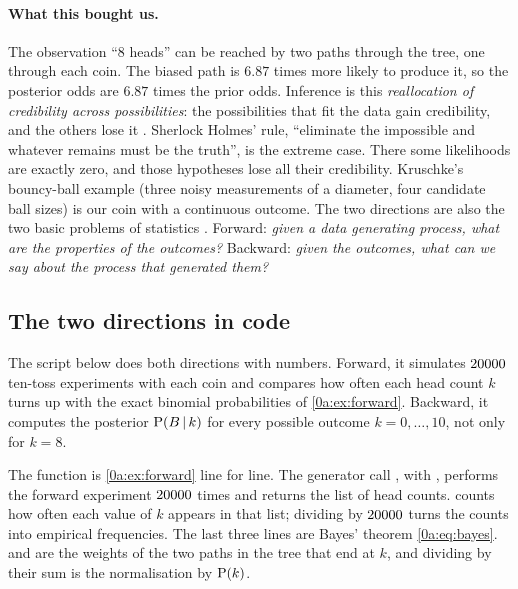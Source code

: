 \paragraph{What this bought us.}
The observation ``8 heads'' can be reached by two paths through the tree, one
through each coin. The biased path is $6.87$ times more likely to produce it,
so the posterior odds are $6.87$ times the prior odds. Inference is this
\emph{reallocation of credibility across possibilities}: the possibilities
that fit the data gain credibility, and the others lose it
. Sherlock Holmes' rule, ``eliminate the
impossible and whatever remains must be the truth'', is the extreme case.
There some likelihoods are exactly zero, and those hypotheses lose all their
credibility. Kruschke's bouncy-ball example (three noisy measurements of a
diameter, four candidate ball sizes) is our coin with a continuous outcome.
The two directions are also the two basic problems of statistics
. Forward: \emph{given a data generating process, what are the
properties of the outcomes?} Backward: \emph{given the outcomes, what can we
say about the process that generated them?}

\subsection*{The two directions in code}

The script below does both directions with numbers. Forward, it simulates
$20000$ ten-toss experiments with each coin and compares how often each
head count $k$ turns up with the exact binomial probabilities of
\cref{0a:ex:forward}. Backward, it computes the posterior $\operatorname{P}(B\,\vert\, k)$
for every possible outcome $k=0,\dots,10$, not only for $k=8$.


The function  is \cref{0a:ex:forward} line for line.
The generator call , with , performs
the forward experiment $20000$ times and returns the list of head counts.
 counts how often each value of $k$ appears in that list;
dividing by $20000$ turns the counts into empirical frequencies. The last
three lines are Bayes' theorem \eqref{0a:eq:bayes}.  and
 are the weights of the two paths in the tree that end at
$k$, and dividing by their sum is the normalisation by $\operatorname{P}(k)$.

